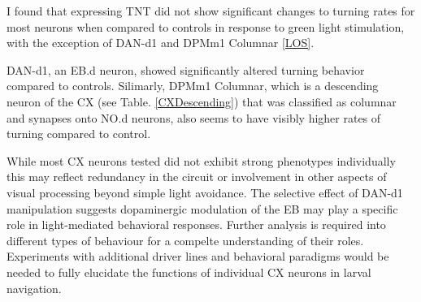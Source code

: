      \begin{table}[H]
    \centering
    \caption{ \textbf{Neurons tested for LOF} Neuron names, corresponding split GAL4 line used for LOF experiments, and lineage information.}
    \label{TNTlines}
    \end{table}

    I found that expressing TNT did not show significant changes to turning rates for most neurons when compared to controls in response to green light stimulation, with the exception of DAN-d1 and DPMm1 Columnar \ref{LOS}. 

    DAN-d1, an EB.d neuron, showed significantly altered turning behavior compared to controls. 
    Silimarly, DPMm1 Columnar, which is a descending neuron of the CX (see Table. \ref{CXDescending}) that was classified as columnar and synapses onto NO.d neurons,  also seems to have visibly higher rates of turning compared to control. 
    
    While most CX neurons tested did not exhibit strong phenotypes individually this may reflect redundancy in the circuit or involvement in other aspects of visual processing beyond simple light avoidance. The selective effect of DAN-d1 manipulation suggests dopaminergic modulation of the EB may play a specific role in light-mediated behavioral responses. Further analysis is required into different types of behaviour for a compelte understanding of their roles. Experiments with additional driver lines and behavioral paradigms would be needed to fully elucidate the functions of individual CX neurons in larval navigation.


